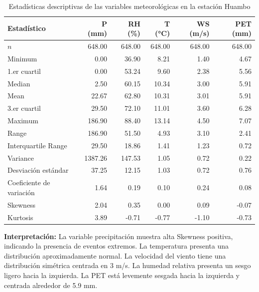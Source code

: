 \begin{table}[htbp]
\centering
\caption{Estadísticas descriptivas de las variables meteorológicas en la estación Huambo}
\label{tab:stat_huambo}
\scriptsize
\begin{tabular}{lrrrrr}
\toprule
\textbf{Estadístico} & \textbf{P (mm)} & \textbf{RH (\%)} & \textbf{T (°C)} & \textbf{WS (m/s)} & \textbf{PET (mm)} \\
\midrule
$n$         & 648.00 & 648.00 & 648.00 & 648.00 & 648.00 \\
Minimum                         & 0.00   & 36.90  & 8.21   & 1.40   & 4.67   \\
1.er cuartil                 & 0.00   & 53.24  & 9.60   & 2.38   & 5.56   \\
Median                       & 2.50   & 60.15  & 10.34  & 3.00   & 5.91   \\
Mean                         & 22.67  & 62.80  & 10.31  & 3.01   & 5.91   \\
3.er cuartil                & 29.50  & 72.10  & 11.01  & 3.60   & 6.28   \\
Maximum                        & 186.90 & 88.40  & 13.14  & 4.50   & 7.07   \\
Range                         & 186.90 & 51.50  & 4.93   & 3.10   & 2.41   \\
Interquartile Range          & 29.50  & 18.86  & 1.41   & 1.23   & 0.72   \\
Variance                    & 1387.26& 147.53 & 1.05   & 0.72   & 0.22   \\
Desviación estándar           & 37.25  & 12.15  & 1.03   & 0.72   & 0.76   \\
Coeficiente de variación     & 1.64   & 0.19   & 0.10   & 0.24   & 0.08   \\
Skewness                    & 2.04   & 0.35   & 0.00   & 0.09   & -0.07  \\
Kurtosis                      & 3.89   & -0.71  & -0.77  & -1.10  & -0.73  \\
\bottomrule
\end{tabular}
\end{table}

\textbf{Interpretación:} La variable precipitación muestra alta Skewness positiva, indicando la presencia de eventos extremos. La temperatura presenta una distribución aproximadamente normal. La velocidad del viento tiene una distribución simétrica centrada en 3 m/s. La humedad relativa presenta un sesgo ligero hacia la izquierda. La PET está levemente sesgada hacia la izquierda y centrada alrededor de 5.9 mm.

